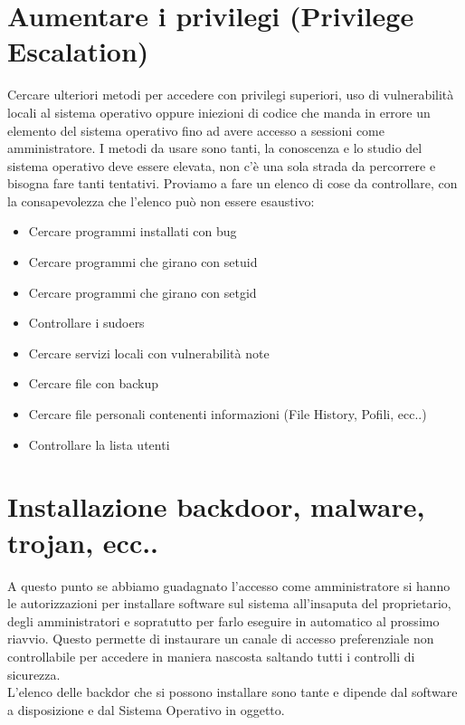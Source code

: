 \section{  Aumentare i privilegi (Privilege Escalation) }

Cercare ulteriori metodi per accedere con privilegi superiori, uso di vulnerabilità locali  al sistema operativo oppure iniezioni di codice che manda in  errore un elemento del sistema operativo fino ad avere accesso a sessioni come amministratore. I metodi da usare sono tanti, la conoscenza e lo studio del sistema operativo deve essere elevata, non c'è una sola strada da percorrere e bisogna fare tanti tentativi. 
Proviamo a fare un elenco di cose da controllare, con la consapevolezza che l'elenco può non essere esaustivo:\\
\begin{itemize}
   
  \item Cercare programmi installati con bug
  \item Cercare programmi che girano con setuid
  \item Cercare programmi che girano con setgid
  \item Controllare i sudoers
  \item Cercare servizi locali con vulnerabilità note
  \item Cercare file con backup 
  \item Cercare file personali contenenti informazioni (File History, Pofili, ecc..)
  \item Controllare la lista utenti
  
\end{itemize}

\section{  Installazione backdoor, malware, trojan, ecc..}

A questo punto se abbiamo guadagnato l'accesso come amministratore si hanno le autorizzazioni per installare software sul sistema all'insaputa del proprietario, degli amministratori e sopratutto per farlo eseguire in automatico al prossimo riavvio. Questo permette di instaurare un canale di accesso preferenziale non controllabile per accedere in maniera nascosta saltando tutti i controlli di sicurezza. \\
L'elenco delle backdor che si possono installare sono tante e dipende dal software a disposizione e dal Sistema Operativo in oggetto.

